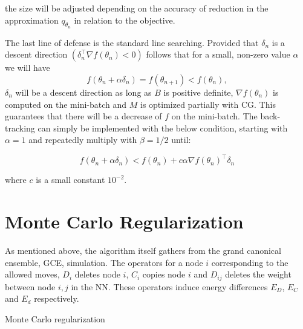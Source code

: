 the size will be adjusted depending on the accuracy of reduction in the approximation $q_{\theta_n}$ in relation to the objective. 

The last line of defense is the standard line searching. Provided that $\delta_n$ is a descent direction $(\delta_n^\top \nabla f(\theta_n) < 0)$ follows that for a small, non-zero value $\alpha$ we will have \[f(\theta_n + \alpha \delta_n) = f(\theta_{n+1}) < f(\theta_n),\] $\delta_n$ will be a descent direction as long as $B$ is positive definite, $\nabla f(\theta_n)$ is computed on the mini-batch and $M$ is optimized partially with CG\cite{Martens2012}. This guarantees that there will be a decrease of $f$ on the mini-batch. The back-tracking can simply be implemented with the below condition, starting with $\alpha = 1$ and repeatedly multiply with $\beta = 1/2$ until:

\[f(\theta_n + \alpha \delta_n) < f(\theta_n) + c \alpha \nabla f(\theta_n)^\top \delta_n\]

where $c$ is a small constant $10^{-2}$.

\section{Monte Carlo Regularization}

As mentioned above, the algorithm itself gathers from the grand canonical ensemble, GCE, simulation. The operators for a node $i$ corresponding to the allowed moves, $D_i$ deletes node $i$, $C_i$ copies node $i$ and $D_{ij}$ deletes the weight between node $i,j$ in the NN. These operators induce energy differences $E_D$, $E_C$ and $E_d$ respectively. 

\begin{algorithm}[h]
    \caption{Monte Carlo regularization}
    \begin{algorithmic}[1]
        \EndIf
    \State {}
    \end{algorithmic}
\end{algorithm}

